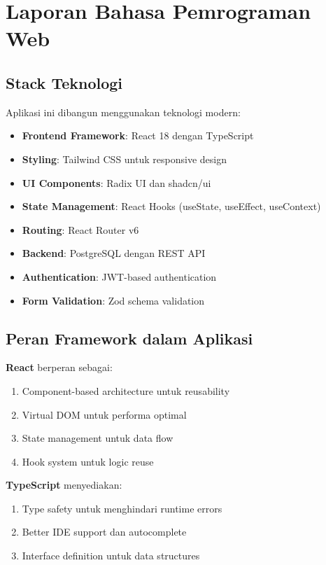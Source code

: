\documentclass[12pt,a4paper]{article}
\begin{document}
\newpage
\section{Laporan Bahasa Pemrograman Web}

\subsection{Stack Teknologi}

Aplikasi ini dibangun menggunakan teknologi modern:

\begin{itemize}
    \item \textbf{Frontend Framework}: React 18 dengan TypeScript
    \item \textbf{Styling}: Tailwind CSS untuk responsive design
    \item \textbf{UI Components}: Radix UI dan shadcn/ui
    \item \textbf{State Management}: React Hooks (useState, useEffect, useContext)
    \item \textbf{Routing}: React Router v6
    \item \textbf{Backend}: PostgreSQL dengan REST API
    \item \textbf{Authentication}: JWT-based authentication
    \item \textbf{Form Validation}: Zod schema validation
\end{itemize}

\subsection{Peran Framework dalam Aplikasi}

\textbf{React} berperan sebagai:
\begin{enumerate}
    \item Component-based architecture untuk reusability
    \item Virtual DOM untuk performa optimal
    \item State management untuk data flow
    \item Hook system untuk logic reuse
\end{enumerate}

\textbf{TypeScript} menyediakan:
\begin{enumerate}
    \item Type safety untuk menghindari runtime errors
    \item Better IDE support dan autocomplete
    \item Interface definition untuk data structures
\end{enumerate}
\end{document}
